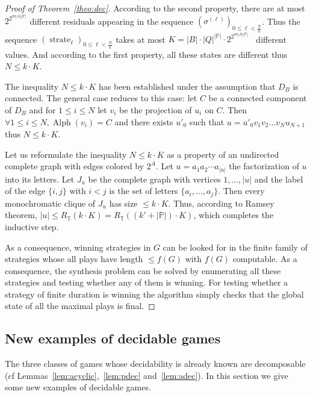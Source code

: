 \documentclass[a4paper,UKenglish]{lipics-v2016}
\newcommand{\PP}{\mathbb{P}}
\newcommand{\TT}{\mathbb{T}}
\DeclareMathOperator{\alphabet}{Alph}
\DeclareMathOperator{\sstate}{strate}
\begin{document}
\begin{proof}[Proof of Theorem~\ref{theo:dec}]
According to the second property,
there
are at most $2^{ 2^{m|A||\PP|}}$ different residuals appearing in the sequence
$(\sigma^{(\ell)})_{0\leq \ell < \frac{N}{k}}$.
Thus the sequence $(\sstate_\ell)_{0 \leq \ell< \frac{N}{k}}$ takes at most 
$
K=
|B|\cdot |Q|^{|\PP|} 
\cdot 2^{ 2^{m|A||\PP| }}\enspace
$
different values.
And according to the first property, all these states are different thus 
$N \leq k\cdot K
$.

The inequality $N \leq k\cdot K$ has been established  under the assumption that $D_B$ is connected.
The general case reduces to this case: let $C$
be a connected component of $D_B$ and for $1\leq i \leq N$
let $v_i$ be the projection of $u_i$ on $C$.
Then $\forall 1\leq i \leq N, \alphabet(v_i)=C$
and
there exists $u'_0$ such that
$u=u'_0 v_1v_2\ldots v_N u_{N+1}$ thus $N \leq k\cdot K$.



Let us reformulate the inequality $N \leq k\cdot K$ as a property of an undirected complete graph
with edges colored by $2^A$.
Let $u=a_1a_2\cdots a_{|u|}$ the factorization of $u$ into its letters.
Let $J_u$ be the complete graph with vertices $1,\ldots, |u|$
and the label of the edge $\{i , j\}$ with $i<j$ is the set of letters $\{a_i,\ldots ,a_j\}$.
Then every  monochromatic clique of $J_u$ has size $\leq k\cdot K$.
Thus, according to Ramsey theorem,
$
|u|
\leq
R_\TT\left(k\cdot K\right)
=
R_\TT\left((k'+|\PP|)\cdot K\right)
$,
which completes the inductive step.

As a consequence, winning strategies in $G$ can be looked for in the finite family of strategies
whose all plays have length $\leq f(G)$
with $f(G)$ computable.
As a consequence,
the synthesis problem
can be solved
by enumerating all these strategies and testing whether any of them is winning.
For testing whether a strategy of finite duration
is winning the algorithm simply checks that the global state of all the maximal plays is final.
\end{proof}



\subsection{New examples of decidable games}

The three classes of games whose decidability is already known
are decomposable  (cf Lemmas~\ref{lem:acyclic},~\ref{lem:pdec} and~\ref{lem:adec}).
In this section we give some new examples of decidable games.
\end{document}
